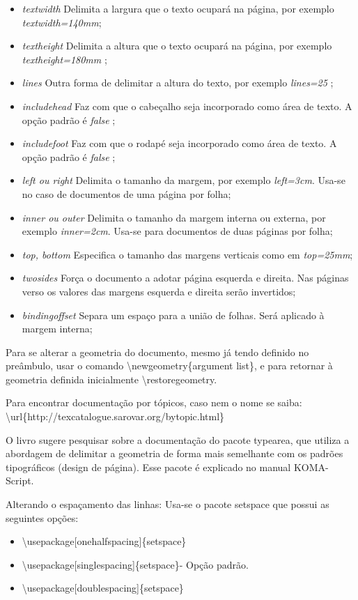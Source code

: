 \documentclass[a4paper, 12pts]{book}
\begin{document}
\begin{itemize}
    \item \emph{textwidth} Delimita a largura que o texto ocupará na página, por exemplo \emph{textwidth=140mm};
    \item \emph{textheight} Delimita a altura que o texto ocupará na página, por exemplo \emph{textheight=180mm} ;
    \item \emph{lines} Outra forma de delimitar a altura do texto, por exemplo \emph{lines=25} ;
    \item \emph{includehead} Faz com que o cabeçalho seja incorporado como área de texto. A opção padrão é \emph{false} ;
    \item \emph{includefoot} Faz com que o rodapé seja incorporado como área de texto. A opção padrão é \emph{false} ;
    \item \emph{left ou right} Delimita o tamanho da margem, por exemplo \emph{left=3cm}. Usa-se no caso de documentos de uma página por folha;
    \item \emph{inner ou outer} Delimita o tamanho da margem interna ou externa, por exemplo \emph{inner=2cm}. Usa-se para documentos de duas páginas por folha;
    \item \emph{top, bottom} Especifica o tamanho das margens verticais como em \emph{top=25mm};
    \item \emph{twosides} Força o documento a adotar página esquerda e direita. Nas páginas verso os valores das margens esquerda e direita serão invertidos;
    \item \emph{bindingoffset} Separa um espaço para a união de folhas. Será aplicado à margem interna;
\end{itemize}

Para se alterar a geometria do documento, mesmo já tendo definido no preâmbulo,
usar o comando \textbackslash newgeometry\{argument list\},
e para retornar à geometria definida inicialmente \textbackslash restoregeometry.

Para encontrar documentação por tópicos, caso nem o nome se saiba:
\textbackslash url\{http://texcatalogue.sarovar.org/bytopic.html\}

O livro sugere pesquisar sobre a documentação do pacote typearea, que utiliza a abordagem de delimitar a geometria
de forma mais semelhante com os padrões tipográficos (design de página).
Esse pacote é explicado no manual KOMA-Script.

Alterando o espaçamento das linhas:
Usa-se o pacote setspace que possui as seguintes opções:
\begin{itemize}
    \item \textbackslash usepackage[onehalfspacing]\{setspace\}
    \item \textbackslash usepackage[singlespacing]\{setspace\}- Opção padrão.
    \item \textbackslash usepackage[doublespacing]\{setspace\}
\end{itemize}
\end{document}
